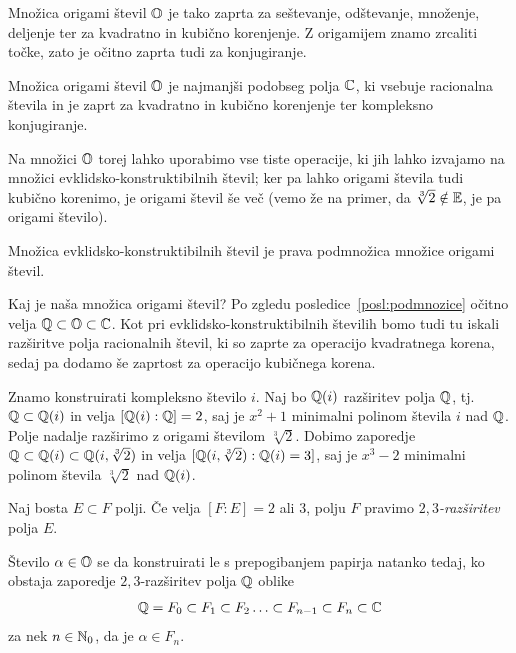 Množica origami števil $\mathbb O$ je tako zaprta za seštevanje, odštevanje, množenje, deljenje ter za kvadratno in kubično korenjenje. Z origamijem znamo zrcaliti točke, zato je očitno zaprta tudi za konjugiranje.

\begin{posledica}
    Množica origami števil $\mathbb O$ je najmanjši podobseg polja $\mathbb C$, ki vsebuje racionalna števila in je zaprt za kvadratno in kubično korenjenje ter kompleksno konjugiranje.
\end{posledica}

Na množici $\mathbb O$ torej lahko uporabimo vse tiste operacije, ki jih lahko izvajamo na množici evklidsko-konstruktibilnih števil; ker pa lahko origami števila tudi kubično korenimo, je origami števil še več (vemo že na primer, da $\sqrt[3]{2} \notin \mathbb E$, je pa origami število).

\begin{posledica}
    Množica evklidsko-konstruktibilnih števil je prava podmnožica množice origami števil.
\end{posledica}

Kaj je naša množica origami števil? Po zgledu posledice~\ref{posl:podmnozice} očitno velja $\mathbb Q \subset \mathbb O \subset \mathbb C$. Kot pri evklidsko-konstruktibilnih številih bomo tudi tu iskali razširitve polja racionalnih števil, ki so zaprte za operacijo kvadratnega korena, sedaj pa dodamo še zaprtost za operacijo kubičnega korena.

Znamo konstruirati kompleksno število $i$. Naj bo $\mathbb Q(i)$ razširitev polja $\mathbb Q$, tj.\ $\mathbb Q \subset \mathbb Q(i)$ in velja $[\mathbb Q(i) : \mathbb Q] = 2$, saj je $x^2 + 1$ minimalni polinom števila $i$ nad $\mathbb Q$. Polje nadalje razširimo z origami številom $\sqrt[3]{2}$. Dobimo zaporedje $\mathbb Q \subset \mathbb Q(i) \subset \mathbb Q(i, \sqrt[3]{2})$ in velja $[\mathbb Q(i, \sqrt[3]{2}) : \mathbb Q(i) = 3]$, saj je $x^3 - 2$ minimalni polinom števila $\sqrt[3]{2}$ nad $\mathbb Q(i)$.

\begin{definicija}
    Naj bosta $E \subset F$ polji. Če velja $[F:E] = 2$ ali $3$, polju $F$ pravimo \emph{$2,3$-razširitev} polja $E$.
\end{definicija}

\begin{izrek}
    \label{izr:orig_konstr}
    Število $\alpha \in \mathbb O$ se da konstruirati le s prepogibanjem papirja natanko tedaj, ko obstaja zaporedje $2,3$-razširitev polja $\mathbb Q$ oblike
    $$ \mathbb Q = F_0 \subset F_1 \subset F_2 \ldots \subset F_{n-1} \subset F_n \subset \mathbb C $$
    za nek $n \in \mathbb N_0$, da je $\alpha \in F_n$.
\end{izrek}

